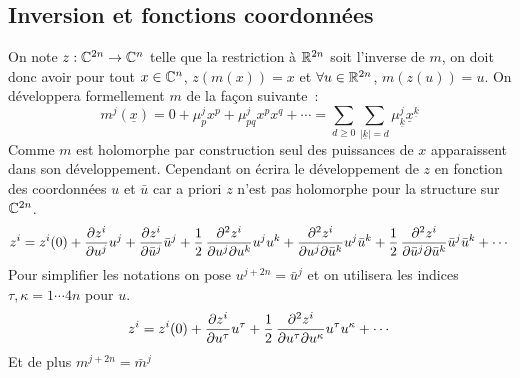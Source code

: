 \documentclass[a4paper,draft]{amsart}
\begin{document}
\subsection{Inversion et fonctions coordonnées}
\begin{center}\end{center}
On note $z:\mathbb{C}^{2n} \rightarrow \mathbb{C}^n$ telle que la restriction à $\mathbb{R}^{2n}$ soit l'inverse de $m$, on doit donc avoir pour tout $x \in \mathbb{C}^n$, $z(m(x)) = x$ et $\forall u \in \mathbb{R}^{2n}$, $m(z(u)) = u$. On développera formellement $m$ de la façon suivante~:
\[
m^j(\underline{x}) = 0 + \mu^j_p x^p + \mu^j_{pq} x^p x^q + \cdots = \sum_{d \geq 0} \sum_{|\underline{k}| = d} \mu^j_{\underline{k}}\underline{x}^{\underline{k}}
\]
Comme $m$ est holomorphe par construction seul des puissances de $x$ apparaissent dans son développement.
Cependant on écrira le développement de $z$ en fonction des coordonnées $u$ et $\bar{u}$ car a priori $z$ n'est pas holomorphe pour la structure sur $\mathbb{C}^{2n}$.
\[
z^i = z^i(0) + 
\dfrac{\partial{z^i}}{\partial{u^j}}u^j + \dfrac{\partial{z^i}}{\partial{\bar{u}^j}}\bar{u}^j
+ \operatorname{\frac{1}{2}} \dfrac{\partial^2{z^i}}{\partial{u^j}\partial{u^k}}u^ju^k + \dfrac{\partial^2{z^i}}{\partial{u^j}\partial{\bar{u}^k}}u^j\bar{u}^k + \operatorname{\frac{1}{2}} \dfrac{\partial^2{z^i}}{\partial{\bar{u}^j}\partial{\bar{u}^k}}\bar{u}^j\bar{u}^k + \cdots
\]
Pour simplifier les notations on pose $u^{j+2n} = \bar{u}^j$ et on utilisera les indices $\tau, \kappa = 1 \cdots 4n$ pour $u$.
\[
z^i = z^i(0) + \dfrac{\partial{z^i}}{\partial{u^\tau}}u^\tau +
\operatorname{\frac{1}{2}} \dfrac{\partial^2{z^i}}{\partial{u^\tau}\partial{u^\kappa}} u^\tau u^\kappa + \cdots
\]
Et de plus $m^{j+2n} = \bar{m}^{j}$
\end{document}
